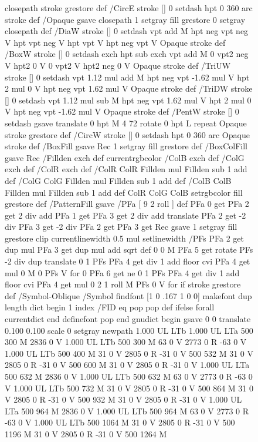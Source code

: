 \documentclass{LMCS}
\begin{document}
\begin{figure}[!tbp]
\begin{minipage}[b]{.47\linewidth}
{{{{  closepath stroke grestore } def
/CircE { stroke [] 0 setdash 
  hpt 0 360 arc stroke } def
/Opaque { gsave closepath 1 setgray fill grestore 0 setgray closepath } def
/DiaW { stroke [] 0 setdash vpt add M
  hpt neg vpt neg V hpt vpt neg V
  hpt vpt V hpt neg vpt V Opaque stroke } def
/BoxW { stroke [] 0 setdash exch hpt sub exch vpt add M
  0 vpt2 neg V hpt2 0 V 0 vpt2 V
  hpt2 neg 0 V Opaque stroke } def
/TriUW { stroke [] 0 setdash vpt 1.12 mul add M
  hpt neg vpt -1.62 mul V
  hpt 2 mul 0 V
  hpt neg vpt 1.62 mul V Opaque stroke } def
/TriDW { stroke [] 0 setdash vpt 1.12 mul sub M
  hpt neg vpt 1.62 mul V
  hpt 2 mul 0 V
  hpt neg vpt -1.62 mul V Opaque stroke } def
/PentW { stroke [] 0 setdash gsave
  translate 0 hpt M 4 {72 rotate 0 hpt L} repeat
  Opaque stroke grestore } def
/CircW { stroke [] 0 setdash 
  hpt 0 360 arc Opaque stroke } def
/BoxFill { gsave Rec 1 setgray fill grestore } def
/BoxColFill {
  gsave Rec
  /Fillden exch def
  currentrgbcolor
  /ColB exch def /ColG exch def /ColR exch def
  /ColR ColR Fillden mul Fillden sub 1 add def
  /ColG ColG Fillden mul Fillden sub 1 add def
  /ColB ColB Fillden mul Fillden sub 1 add def
  ColR ColG ColB setrgbcolor
  fill grestore } def
/PatternFill { gsave /PFa [ 9 2 roll ] def
    PFa 0 get PFa 2 get 2 div add PFa 1 get PFa 3 get 2 div add translate
    PFa 2 get -2 div PFa 3 get -2 div PFa 2 get PFa 3 get Rec
    gsave 1 setgray fill grestore clip
    currentlinewidth 0.5 mul setlinewidth
    /PFs PFa 2 get dup mul PFa 3 get dup mul add sqrt def
    0 0 M PFa 5 get rotate PFs -2 div dup translate
	0 1 PFs PFa 4 get div 1 add floor cvi
	{ PFa 4 get mul 0 M 0 PFs V } for
    0 PFa 6 get ne {
	0 1 PFs PFa 4 get div 1 add floor cvi
	{ PFa 4 get mul 0 2 1 roll M PFs 0 V } for
    } if
    stroke grestore } def
/Symbol-Oblique /Symbol findfont [1 0 .167 1 0 0] makefont
dup length dict begin {1 index /FID eq {pop pop} {def} ifelse} forall
currentdict end definefont pop
end
gnudict begin
gsave
0 0 translate
0.100 0.100 scale
0 setgray
newpath
1.000 UL
LTb
1.000 UL
LTa
500 300 M
2836 0 V
1.000 UL
LTb
500 300 M
63 0 V
2773 0 R
-63 0 V
1.000 UL
LTb
500 400 M
31 0 V
2805 0 R
-31 0 V
500 532 M
31 0 V
2805 0 R
-31 0 V
500 600 M
31 0 V
2805 0 R
-31 0 V
1.000 UL
LTa
500 632 M
2836 0 V
1.000 UL
LTb
500 632 M
63 0 V
2773 0 R
-63 0 V
1.000 UL
LTb
500 732 M
31 0 V
2805 0 R
-31 0 V
500 864 M
31 0 V
2805 0 R
-31 0 V
500 932 M
31 0 V
2805 0 R
-31 0 V
1.000 UL
LTa
500 964 M
2836 0 V
1.000 UL
LTb
500 964 M
63 0 V
2773 0 R
-63 0 V
1.000 UL
LTb
500 1064 M
31 0 V
2805 0 R
-31 0 V
500 1196 M
31 0 V
2805 0 R
-31 0 V
500 1264 M
}}}
\end{minipage}
\end{figure}
\end{document}
